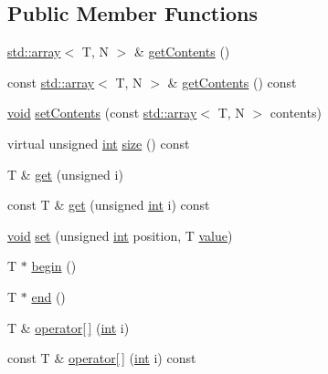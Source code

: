 \subsection*{Public Member Functions}
\begin{DoxyCompactItemize}
\item 
\hyperlink{_s_d_l__opengl__glext_8h_a52f38e7d822a46377fde7a02708eedb1}{std\+::array}$<$ T, N $>$ \& \hyperlink{classmc_1_1_vector_ad8649fb50d1cebdc4f7e2886f445560a}{get\+Contents} ()
\item 
const \hyperlink{_s_d_l__opengl__glext_8h_a52f38e7d822a46377fde7a02708eedb1}{std\+::array}$<$ T, N $>$ \& \hyperlink{classmc_1_1_vector_ac312084ca4f2fe312eec6799df7e3f22}{get\+Contents} () const 
\item 
\hyperlink{_s_d_l__opengles2__gl2ext_8h_ae5d8fa23ad07c48bb609509eae494c95}{void} \hyperlink{classmc_1_1_vector_a2e674c851be8cf10808c86895e9ca86f}{set\+Contents} (const \hyperlink{_s_d_l__opengl__glext_8h_a52f38e7d822a46377fde7a02708eedb1}{std\+::array}$<$ T, N $>$ contents)
\item 
virtual unsigned \hyperlink{_s_d_l__thread_8h_a6a64f9be4433e4de6e2f2f548cf3c08e}{int} \hyperlink{classmc_1_1_vector_a85c37dc7b6c2ad12f5cab67d6db54b49}{size} () const 
\item 
T \& \hyperlink{classmc_1_1_vector_a3335869546b80addf0aafe5e009ffbde}{get} (unsigned i)
\item 
const T \& \hyperlink{classmc_1_1_vector_a58776300ccb5cac12fc04a24c9848053}{get} (unsigned \hyperlink{_s_d_l__thread_8h_a6a64f9be4433e4de6e2f2f548cf3c08e}{int} i) const 
\item 
\hyperlink{_s_d_l__opengles2__gl2ext_8h_ae5d8fa23ad07c48bb609509eae494c95}{void} \hyperlink{classmc_1_1_vector_a11e1f8cfd518752bb19b35437c66ee9d}{set} (unsigned \hyperlink{_s_d_l__thread_8h_a6a64f9be4433e4de6e2f2f548cf3c08e}{int} position, T \hyperlink{_s_d_l__opengl__glext_8h_a8ad81492d410ff2ac11f754f4042150f}{value})
\item 
T $\ast$ \hyperlink{classmc_1_1_vector_a1cb61e23c56abeb0b1d4c1a8b569e831}{begin} ()
\item 
T $\ast$ \hyperlink{classmc_1_1_vector_a728eef3a0e46669e5c7be8792a8b7b26}{end} ()
\item 
T \& \hyperlink{classmc_1_1_vector_a1113b584d428e6943e7ea23df89ef006}{operator\mbox{[}$\,$\mbox{]}} (\hyperlink{_s_d_l__thread_8h_a6a64f9be4433e4de6e2f2f548cf3c08e}{int} i)
\item 
const T \& \hyperlink{classmc_1_1_vector_a1bbd519ec7b6f6902ce81983478e3c92}{operator\mbox{[}$\,$\mbox{]}} (\hyperlink{_s_d_l__thread_8h_a6a64f9be4433e4de6e2f2f548cf3c08e}{int} i) const 

\end{DoxyCompactItemize}
